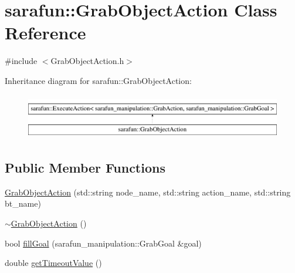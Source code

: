 \hypertarget{classsarafun_1_1GrabObjectAction}{\section{sarafun\-:\-:Grab\-Object\-Action Class Reference}
\label{classsarafun_1_1GrabObjectAction}
}


{\ttfamily \#include $<$Grab\-Object\-Action.\-h$>$}

Inheritance diagram for sarafun\-:\-:Grab\-Object\-Action\-:\begin{figure}[H]
\begin{center}
\leavevmode
\includegraphics[height=2.000000cm]{classsarafun_1_1GrabObjectAction}
\end{center}
\end{figure}
\subsection*{Public Member Functions}
\begin{DoxyCompactItemize}
\item 
\hyperlink{classsarafun_1_1GrabObjectAction_abca8f2d915cf1a8d507d04885b3e1df9}{Grab\-Object\-Action} (std\-::string node\-\_\-name, std\-::string action\-\_\-name, std\-::string bt\-\_\-name)
\item 
\hyperlink{classsarafun_1_1GrabObjectAction_a1b1ee63f9ba24332b2184b67021dbf0e}{$\sim$\-Grab\-Object\-Action} ()
\item 
bool \hyperlink{classsarafun_1_1GrabObjectAction_a61fe8b0cb93dec244f10d6c5dbee913c}{fill\-Goal} (sarafun\-\_\-manipulation\-::\-Grab\-Goal \&goal)
\item 
double \hyperlink{classsarafun_1_1GrabObjectAction_a6e2ee834fda8bd8d0dbdc101c8acdd9c}{get\-Timeout\-Value} ()
\end{DoxyCompactItemize}


